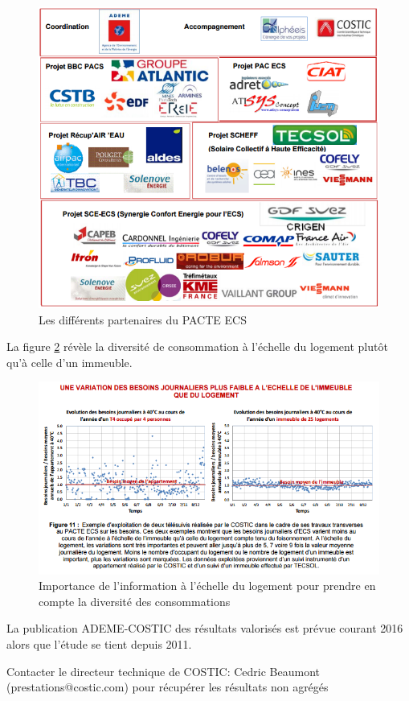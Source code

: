 \begin{figure}[h]
\centering
\includegraphics[scale=0.8]{Images/PACTEECS}
\caption{Les différents partenaires du PACTE ECS}
\label{fig:PACTEECS}
\end{figure}

La figure \ref{fig:Foisonnement_ECS} révèle la diversité de consommation à l'échelle du logement plutôt qu'à celle d'un immeuble.

\begin{figure}[h]
\centering
\includegraphics[scale=0.9]{Images/Foisonnement_ECS}
\caption{Importance de l'information à l'échelle du logement pour prendre en compte la diversité des consommations}
\label{fig:Foisonnement_ECS}
\end{figure}

La publication ADEME-COSTIC des résultats valorisés est prévue courant 2016 alors que l'étude se tient depuis 2011.

Contacter le directeur technique de COSTIC: Cedric Beaumont (prestations@costic.com) pour récupérer les résultats non agrégés 
